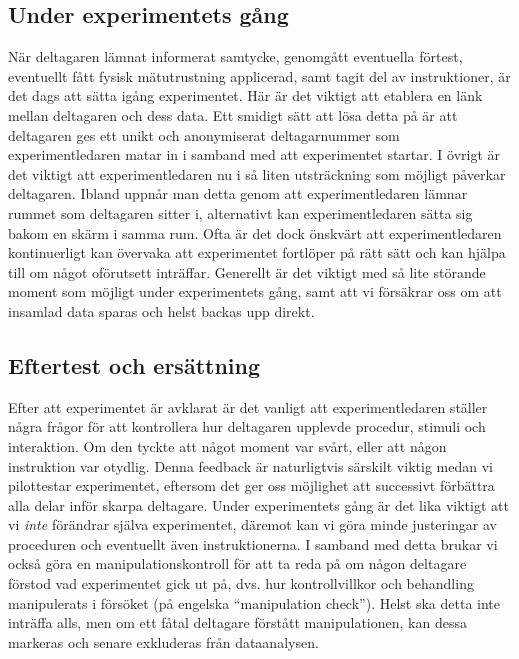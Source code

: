 \documentclass[
]{book}
\begin{document}
\hypertarget{sub07.6.6}{%
\subsection{Under experimentets gång}\label{sub07.6.6}}

När deltagaren lämnat informerat samtycke, genomgått eventuella förtest, eventuellt fått fysisk mätutrustning applicerad, samt tagit del av instruktioner, är det dags att sätta igång experimentet. Här är det viktigt att etablera en länk mellan deltagaren och dess data. Ett smidigt sätt att lösa detta på är att deltagaren ges ett unikt och anonymiserat deltagarnummer som experimentledaren matar in i samband med att experimentet startar. I övrigt är det viktigt att experimentledaren nu i så liten utsträckning som möjligt påverkar deltagaren. Ibland uppnår man detta genom att experimentledaren lämnar rummet som deltagaren sitter i, alternativt kan experimentledaren sätta sig bakom en skärm i samma rum. Ofta är det dock önskvärt att experimentledaren kontinuerligt kan övervaka att experimentet fortlöper på rätt sätt och kan hjälpa till om något oförutsett inträffar. Generellt är det viktigt med så lite störande moment som möjligt under experimentets gång, samt att vi försäkrar oss om att insamlad data sparas och helst backas upp direkt.

\hypertarget{sub07.6.7}{%
\subsection{Eftertest och ersättning}\label{sub07.6.7}}

Efter att experimentet är avklarat är det vanligt att experimentledaren ställer några frågor för att kontrollera hur deltagaren upplevde procedur, stimuli och interaktion. Om den tyckte att något moment var svårt, eller att någon instruktion var otydlig. Denna feedback är naturligtvis särskilt viktig medan vi pilottestar experimentet, eftersom det ger oss möjlighet att successivt förbättra alla delar inför skarpa deltagare. Under experimentets gång är det lika viktigt att vi \emph{inte} förändrar själva experimentet, däremot kan vi göra minde justeringar av proceduren och eventuellt även instruktionerna. I samband med detta brukar vi också göra en manipulationskontroll för att ta reda på om någon deltagare förstod vad experimentet gick ut på, dvs. hur kontrollvillkor och behandling manipulerats i försöket (på engelska ``manipulation check''). Helst ska detta inte inträffa alls, men om ett fåtal deltagare förstått manipulationen, kan dessa markeras och senare exkluderas från dataanalysen.
\end{document}
